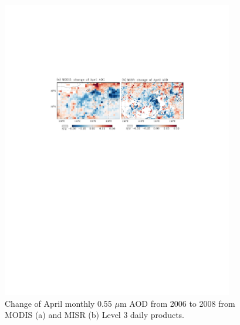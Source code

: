  \begin{figure}[t]
  \centering
  \includegraphics[width={0.90\textwidth}]{figures/a13.pdf}
  \caption{Change of April monthly 0.55 $\mu$m AOD from 2006 to 2008 from MODIS (a) and MISR (b) Level 3 daily products.}
  \label{fig:aodchange}
 \end{figure}

 \subsection{}

